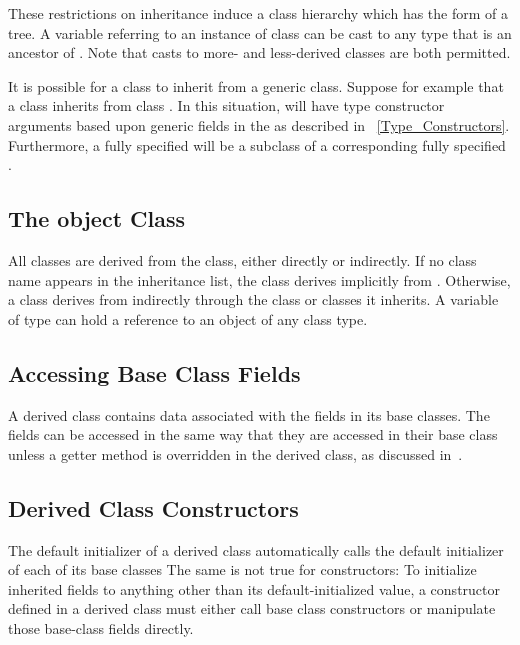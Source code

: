 These restrictions on inheritance induce a class hierarchy which has the form of
a tree.  A variable referring to an instance of class  can be
cast to any type that is an ancestor of .  Note that casts to more- and
less-derived classes are both permitted.

It is possible for a class to inherit from a generic class. Suppose for
example that a class  inherits from class . In this
situation,  will have type constructor arguments based upon
generic fields in the  as described in
~\ref{Type_Constructors}. Furthermore, a fully specified  will be
a subclass of a corresponding fully specified .

\subsection{The object Class}
\label{The_object_Class}

All classes are derived from the  class, either directly or
indirectly.  If no class name appears in the inheritance list, the class derives
implicitly from .  Otherwise, a class derives from 
indirectly through the class or classes it inherits.  A variable of type 
can hold a reference to an object of any class type. 

\subsection{Accessing Base Class Fields}
\label{Accessing_Base_Class_Fields}

A derived class contains data associated with the fields in its base
classes.  The fields can be accessed in the same way that they are
accessed in their base class unless a getter method is
overridden in the derived class, as discussed
in~.

\subsection{Derived Class Constructors}
\label{Derived_Class_Constructors}

The default initializer of a derived class automatically calls the default
initializer of each of its base classes %
The same is not true for constructors:
To initialize inherited fields to anything other than its default-initialized
value, a constructor defined in a derived class must either call base class
constructors or manipulate those base-class fields directly.

